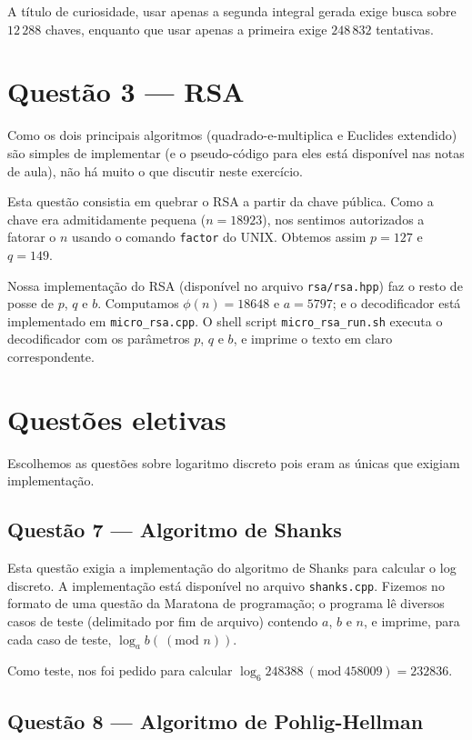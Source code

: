 \documentclass{article}
\renewcommand{\mod}[1]{ \ (\textrm{mod } #1) }
\begin{document}
A título de curiosidade, usar apenas a segunda integral gerada
exige busca sobre $12\,288$ chaves,
enquanto que usar apenas a primeira exige $248\,832$ tentativas.


\section{Questão 3 --- RSA}

Como os dois principais algoritmos
(quadrado-e-multiplica e Euclides extendido)
são simples de implementar
(e o pseudo-código para eles está disponível nas notas de aula),
não há muito o que discutir neste exercício.

Esta questão consistia em quebrar o RSA
a partir da chave pública.
Como a chave era admitidamente pequena ($n = 18923$),
nos sentimos autorizados a fatorar o $n$ usando o comando \verb"factor" do UNIX.
Obtemos assim $p = 127$ e $q = 149$.

Nossa implementação do RSA (disponível no arquivo \verb"rsa/rsa.hpp")
faz o resto de posse de $p$, $q$ e $b$.
Computamos $\phi(n) = 18648$ e $a = 5797$;
e o decodificador está implementado em \verb"micro_rsa.cpp".
O shell script \verb"micro_rsa_run.sh"
executa o decodificador com os parâmetros $p$, $q$ e $b$,
e imprime o texto em claro correspondente.

\section{Questões eletivas}

Escolhemos as questões sobre logaritmo discreto
pois eram as únicas que exigiam implementação.

\subsection{Questão 7 --- Algoritmo de Shanks}

Esta questão exigia a implementação do algoritmo de Shanks para calcular o log discreto.
A implementação está disponível no arquivo \verb"shanks.cpp".
Fizemos no formato de uma questão da Maratona de programação;
o programa lê diversos casos de teste (delimitado por fim de arquivo)
contendo $a$, $b$ e $n$,
e imprime, para cada caso de teste, $\log_a b (\mod n)$.

Como teste, nos foi pedido para calcular $\log_6 248388\ (\mathrm{mod}\ 458009) = 232836$.

\subsection{Questão 8 --- Algoritmo de Pohlig-Hellman}
\end{document}
